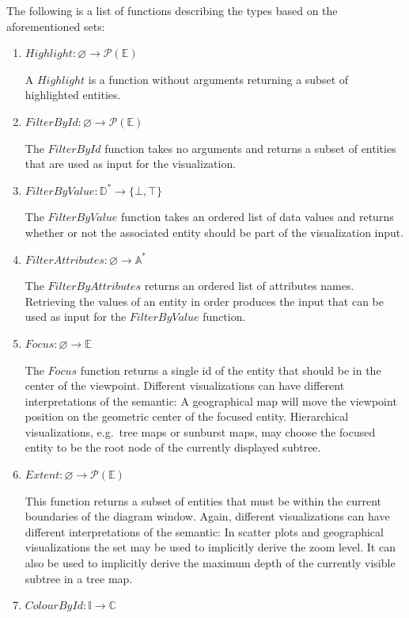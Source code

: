 \documentclass{article}
\begin{document}
The following is a list of functions describing the types based on the aforementioned sets:
\begin{enumerate}
    \item
        $ Highlight: \varnothing \rightarrow \mathcal{P}(\mathbb{E})$

        A $ Highlight $ is a function without arguments returning a subset of highlighted entities.
    \item
        $ FilterById: \varnothing \rightarrow \mathcal{P}(\mathbb{E}) $

        The $FilterById$ function takes no arguments and returns a subset of entities that are used as input for the visualization.
    \item
        $ FilterByValue: \mathbb{D^*} \rightarrow \{ \bot, \top \} $

        The $FilterByValue$ function takes an ordered list of data values and returns whether or not the associated entity should be part of the visualization input.
    \item
        $ FilterAttributes: \varnothing \rightarrow \mathbb{A^*} $

        The $FilterByAttributes$ returns an ordered list of attributes names.
        Retrieving the values of an entity in order produces the input that can be used as input for the $ FilterByValue $ function.
    \item
        $ Focus: \varnothing \rightarrow \mathbb{E} $

        The $ Focus $ function returns a single id of the entity that should be in the center of the viewpoint.
        Different visualizations can have different interpretations of the semantic:
        A geographical map will move the viewpoint position on the geometric center of the focused entity.
        Hierarchical visualizations, e.g.\  tree maps or sunburst maps, may choose the focused entity to be the root node of the currently displayed subtree.
    \item
        $ Extent: \varnothing \rightarrow \mathcal{P}(\mathbb{E}) $

        This function returns a subset of entities that must be within the current boundaries of the diagram window.
        Again, different visualizations can have different interpretations of the semantic:
        In scatter plots and geographical visualizations the set may be used to implicitly derive the zoom level.
        It can also be used to implicitly derive the maximum depth of the currently visible subtree in a tree map.
    \item
        $ ColourById: \mathbb{I} \rightarrow \mathbb{C} $


\end{enumerate}
\end{document}
